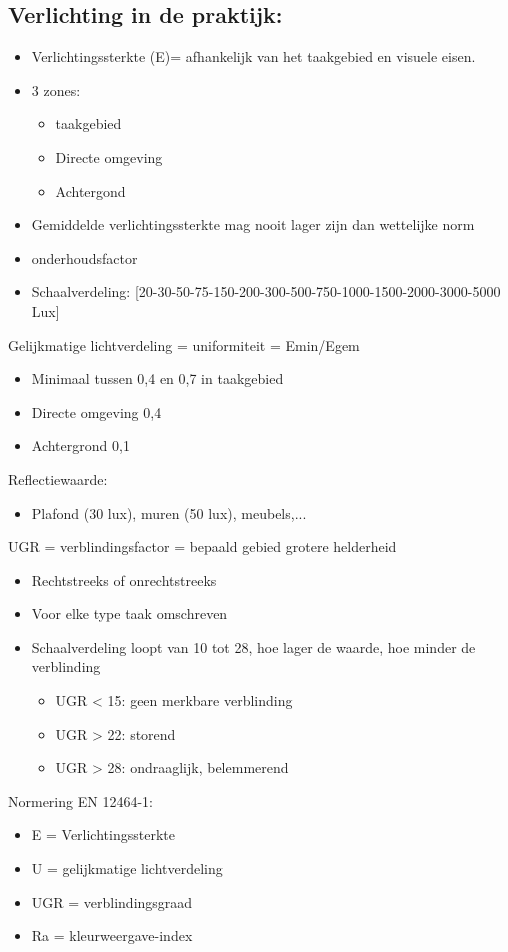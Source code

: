 \documentclass[12pt]{article}
\begin{document}
\subsection{Verlichting in de praktijk:}
\begin{itemize}
    \item Verlichtingssterkte (E)= afhankelijk van het taakgebied en visuele eisen.
    \item 3 zones:\begin{itemize}
        \item taakgebied
        \item Directe omgeving 
        \item Achtergond
    \end{itemize}
    \item Gemiddelde verlichtingssterkte mag nooit lager zijn dan wettelijke norm
    \item onderhoudsfactor
    \item Schaalverdeling: [20-30-50-75-150-200-300-500-750-1000-1500-2000-3000-5000 Lux]
\end{itemize}
Gelijkmatige lichtverdeling = uniformiteit = Emin/Egem\begin{itemize}
    \item Minimaal tussen 0,4 en 0,7 in taakgebied 
    \item Directe omgeving 0,4
    \item Achtergrond 0,1
\end{itemize}
Reflectiewaarde:\begin{itemize}
    \item Plafond (30 lux), muren (50 lux), meubels,...
\end{itemize}
UGR = verblindingsfactor = bepaald gebied grotere helderheid\begin{itemize}
    \item Rechtstreeks of onrechtstreeks
    \item Voor elke type taak omschreven
    \item Schaalverdeling loopt van 10 tot 28, hoe lager de waarde, hoe minder de verblinding\begin{itemize}
        \item UGR < 15: geen merkbare verblinding
        \item UGR > 22: storend
        \item UGR > 28: ondraaglijk, belemmerend
    \end{itemize}
\end{itemize}
Normering EN 12464-1:\begin{itemize}
    \item E = Verlichtingssterkte
    \item U = gelijkmatige lichtverdeling
    \item UGR = verblindingsgraad
    \item Ra = kleurweergave-index
\end{itemize}
\end{document}

